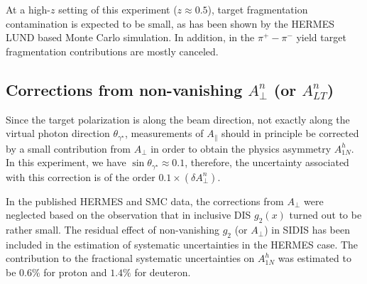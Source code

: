  At a high-$z$ setting of this experiment ($z \approx 0.5$), target fragmentation contamination is 
expected to be small, as has been shown by the HERMES LUND based Monte Carlo simulation. In addition, in the
$\pi^+ - \pi^-$ yield target fragmentation contributions are mostly canceled.


\subsection{Corrections from non-vanishing $A^n_{\perp}$ (or $A^n_{LT}$) }   
Since the target polarization is along the beam direction, not exactly along the
virtual photon  direction $\theta_{\gamma^{\star}}$, measurements of
$A_{\parallel}$ should in principle be corrected by a small contribution from $A_{\perp}$
in order to obtain the physics asymmetry $A_{1N}^h$.  
In this experiment, we have  $\sin \theta_{\gamma^{\star}} \approx 0.1$, therefore,
the uncertainty associated with this correction is of the order $0.1 \times (\delta A^n_{\perp})$. 

In the published HERMES and SMC data, the corrections from $A_{\perp}$ were neglected based on
the observation that in inclusive DIS $g_2(x)$ turned out to be rather small.  The residual
effect of non-vanishing $g_2$ (or $A_{\perp}$) in SIDIS has been included in the 
estimation of systematic uncertainties in the HERMES case. The contribution to the fractional 
systematic uncertainties on $A_{1N}^h$ was estimated to be $0.6 \%$ for proton and 
$1.4 \%$ for deuteron.


